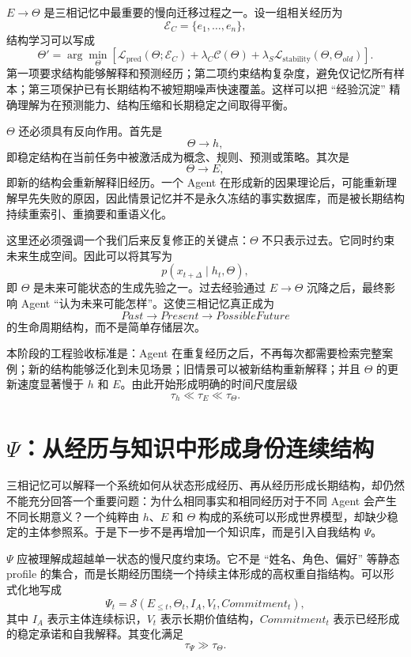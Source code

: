 $E\rightarrow\Theta$ 是三相记忆中最重要的慢向迁移过程之一。设一组相关经历为
\[
\mathcal E_C
=
\{e_1,\ldots,e_n\},
\]
结构学习可以写成
\[
\Theta'
=
\arg\min_{\Theta}
\left[
\mathcal L_{\mathrm{pred}}(\Theta;\mathcal E_C)
+
\lambda_C\mathcal C(\Theta)
+
\lambda_S\mathcal L_{\mathrm{stability}}(\Theta,\Theta_{old})
\right].
\]
第一项要求结构能够解释和预测经历；第二项约束结构复杂度，避免仅记忆所有样本；第三项保护已有长期结构不被短期噪声快速覆盖。这样可以把 ``经验沉淀'' 精确理解为在预测能力、结构压缩和长期稳定之间取得平衡。

$\Theta$ 还必须具有反向作用。首先是
\[
\Theta\rightarrow h,
\]
即稳定结构在当前任务中被激活成为概念、规则、预测或策略。其次是
\[
\Theta\rightarrow E,
\]
即新的结构会重新解释旧经历。一个 Agent 在形成新的因果理论后，可能重新理解早先失败的原因，因此情景记忆并不是永久冻结的事实数据库，而是被长期结构持续重索引、重摘要和重语义化。

这里还必须强调一个我们后来反复修正的关键点：$\Theta$ 不只表示过去。它同时约束未来生成空间。因此可以将其写为
\[
p(x_{t+\Delta}\mid h_t,\Theta),
\]
即 $\Theta$ 是未来可能状态的生成先验之一。过去经验通过 $E\rightarrow\Theta$ 沉降之后，最终影响 Agent ``认为未来可能怎样''。这使三相记忆真正成为
\[
Past\rightarrow Present\rightarrow PossibleFuture
\]
的生命周期结构，而不是简单存储层次。

本阶段的工程验收标准是：Agent 在重复经历之后，不再每次都需要检索完整案例；新的结构能够泛化到未见场景；旧情景可以被新结构重新解释；并且 $\Theta$ 的更新速度显著慢于 $h$ 和 $E$。由此开始形成明确的时间尺度层级
\[
\tau_h\ll\tau_E\ll\tau_\Theta.
\]

\section{$\Psi$：从经历与知识中形成身份连续结构}

三相记忆可以解释一个系统如何从状态形成经历、再从经历形成长期结构，却仍然不能充分回答一个重要问题：为什么相同事实和相同经历对于不同 Agent 会产生不同长期意义？一个纯粹由 $h$、$E$ 和 $\Theta$ 构成的系统可以形成世界模型，却缺少稳定的主体参照系。于是下一步不是再增加一个知识库，而是引入自我结构 $\Psi$。

$\Psi$ 应被理解成超越单一状态的慢尺度约束场。它不是 ``姓名、角色、偏好'' 等静态 profile 的集合，而是长期经历围绕一个持续主体形成的高权重自指结构。可以形式化地写成
\[
\Psi_t
=
\mathcal S(
E_{\le t},
\Theta_t,
I_A,
V_t,
Commitment_t
),
\]
其中 $I_A$ 表示主体连续标识，$V_t$ 表示长期价值结构，$Commitment_t$ 表示已经形成的稳定承诺和自我解释。其变化满足
\[
\tau_\Psi\gg\tau_\Theta.
\]

